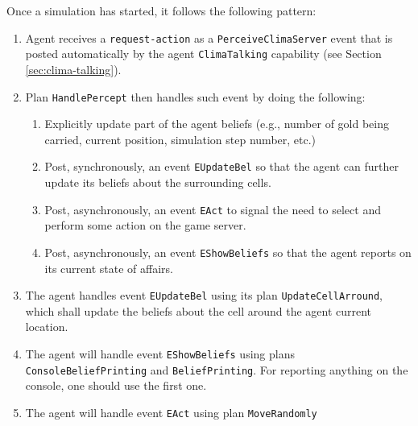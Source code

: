 \documentclass[10pt]{article}
\begin{document}
Once a simulation has started, it follows the following pattern:
%
\begin{enumerate}
 \item Agent receives a \texttt{request-action} as a
\texttt{PerceiveClimaServer} event that is posted automatically by the agent
\texttt{ClimaTalking} capability (see Section \ref{sec:clima-talking}).

\item Plan \texttt{HandlePercept} then handles such event by doing
the following:
%
\begin{enumerate}
\item Explicitly update part of the agent beliefs (e.g., number of gold being
carried, current position, simulation step number, etc.)

\item Post, synchronously,  an event \texttt{EUpdateBel} so that the agent
can further update its beliefs about the surrounding cells.


\item Post, asynchronously, an event \texttt{EAct} to signal the need to select
and perform some action on the game server.

\item Post, asynchronously, an event \texttt{EShowBeliefs} so that the agent reports on its current state of affairs.

\end{enumerate}
\item The agent handles event \texttt{EUpdateBel} using its plan \texttt{UpdateCellArround}, which shall update the beliefs about the cell around the agent current location.


\item The agent will handle event \texttt{EShowBeliefs} using plans \texttt{ConsoleBeliefPrinting} and \texttt{BeliefPrinting}. For reporting anything on the console, one should use the first one.


\item The agent will handle event \texttt{EAct} using plan \texttt{MoveRandomly}
\end{enumerate}
\end{document}
